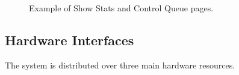 \begin{figure}[H]
    \centering     %
    \caption{Example of Show Stats and Control Queue pages.}
\end{figure}

\subsection{Hardware Interfaces}

The system is distributed over three main hardware resources.

